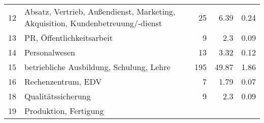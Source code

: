 \begin{longtable}{lXrrr}
     12 &
     \multicolumn{1}{X}{ Absatz, Vertrieb, Außendienst, Marketing, Akquisition, Kundenbetreuung/-dienst   } &


       \num{25} &
       \num[round-mode=places,round-precision=2]{6.39} &
         \num[round-mode=places,round-precision=2]{0.24} \\

     13 &
     \multicolumn{1}{X}{ PR, Öffentlichkeitsarbeit   } &


       \num{9} &
       \num[round-mode=places,round-precision=2]{2.3} &
         \num[round-mode=places,round-precision=2]{0.09} \\

     14 &
     \multicolumn{1}{X}{ Personalwesen   } &


       \num{13} &
       \num[round-mode=places,round-precision=2]{3.32} &
         \num[round-mode=places,round-precision=2]{0.12} \\

     15 &
     \multicolumn{1}{X}{ betriebliche Ausbildung, Schulung, Lehre   } &


       \num{195} &
       \num[round-mode=places,round-precision=2]{49.87} &
         \num[round-mode=places,round-precision=2]{1.86} \\

     16 &
     \multicolumn{1}{X}{ Rechenzentrum, EDV   } &


       \num{7} &
       \num[round-mode=places,round-precision=2]{1.79} &
         \num[round-mode=places,round-precision=2]{0.07} \\

     18 &
     \multicolumn{1}{X}{ Qualitätssicherung   } &


       \num{9} &
       \num[round-mode=places,round-precision=2]{2.3} &
         \num[round-mode=places,round-precision=2]{0.09} \\

     19 &
     \multicolumn{1}{X}{ Produktion, Fertigung   } &



\end{longtable}
